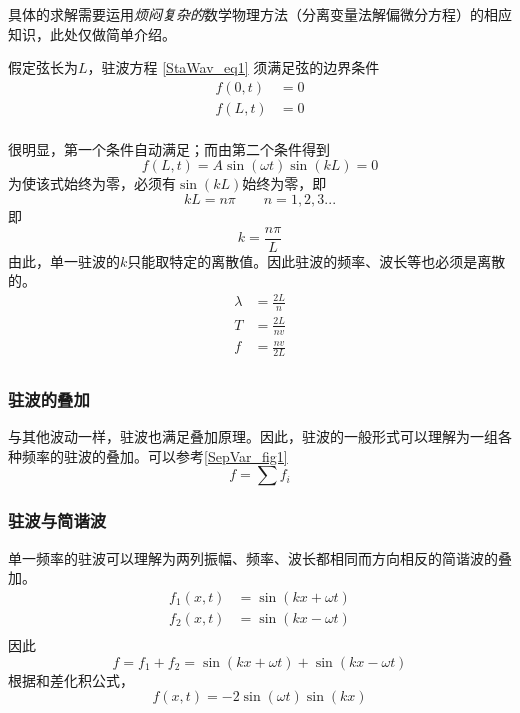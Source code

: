 具体的求解需要运用\textsl{烦闷复杂的}数学物理方法（分离变量法解偏微分方程）的相应知识，此处仅做简单介绍。

假定弦长为$L$，驻波方程 \autoref{StaWav_eq1} 须满足弦的边界条件 
$$
\begin{aligned}
f(0,t)&=0\\
f(L,t)&=0\\
\end{aligned}
$$

很明显，第一个条件自动满足；而由第二个条件得到
$$
f(L,t)=A\sin(\omega t)\sin(kL)=0
$$
为使该式始终为零，必须有$\sin(kL)$始终为零，即
$$kL = n\pi \qquad n=1,2,3...$$
即
\begin{equation}
k=\frac{n\pi}{L}
\end{equation}
由此，单一驻波的$k$只能取特定的离散值。因此驻波的频率、波长等也必须是离散的。
\begin{equation}
\begin{aligned}
\lambda &=\frac{2L}{n}\\
T &=\frac{2L}{nv}\\
f &=\frac{nv}{2L}\\
\end{aligned}
\end{equation}
\subsubsection{驻波的叠加}
与其他波动一样，驻波也满足叠加原理。因此，驻波的一般形式可以理解为一组各种频率的驻波的叠加。可以参考\autoref{SepVar_fig1}~
$$f=\sum f_i$$

\subsubsection{驻波与简谐波}
单一频率的驻波可以理解为两列振幅、频率、波长都相同而方向相反的简谐波的叠加。
$$
\begin{aligned}
f_1(x,t)&=\sin(kx+\omega t)\\
f_2(x,t)&=\sin(kx-\omega t)\\
\end{aligned}
$$
因此
$$f=f_1+f_2=\sin(kx+\omega t)+\sin(kx-\omega t)$$
根据和差化积公式，
\begin{equation}
f(x,t)=-2\sin(\omega t)\sin(kx)
\end{equation}

